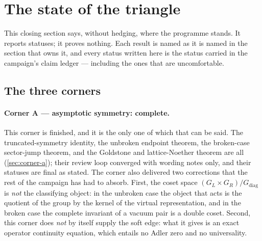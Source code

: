 
\section{The state of the triangle}
\label{sec:triangle-status}

This closing section says, without hedging, where the programme stands. It
reports statuses; it proves nothing. Each result is named as it is named in
the section that owns it, and every status written here is the status carried
in the campaign's claim ledger --- including the ones that are uncomfortable.

\subsection{The three corners}

\paragraph{Corner A --- asymptotic symmetry: complete.}
This corner is finished, and it is the only one of which that can be said.
The truncated-symmetry identity, the unbroken endpoint theorem, the
broken-case sector-jump theorem, and the Goldstone and lattice-Noether
theorem are all \statusProved{} (\cref{sec:corner-a}); their review loop
converged with wording notes only, and their statuses are final as stated. The
corner also delivered two corrections that the rest of the campaign has had
to absorb. First, the coset space $(G_L\times G_R)/G_{\mathrm{diag}}$ is
\emph{not} the classifying object: in the unbroken case the object that acts
is the quotient of the group by the kernel of the virtual representation, and
in the broken case the complete invariant of a vacuum pair is a double coset.
Second, this corner does \emph{not} by itself supply the soft edge: what it
gives is an exact operator continuity equation, which entails no Adler zero
and no universality.

